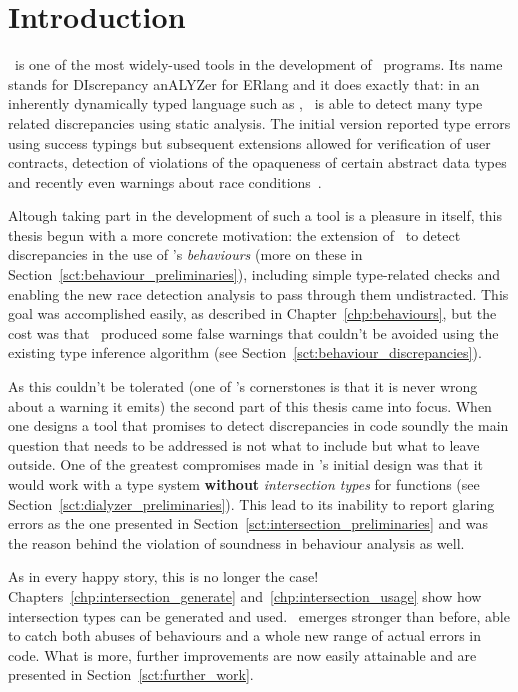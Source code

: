 \chapter{Introduction}

\dr\ is one of the most widely-used tools in the development of
\er\ programs. Its name stands for DIscrepancy anALYZer for ERlang and
it does exactly that: in an inherently dynamically typed language such
as \er, \dr\ is able to detect many type related discrepancies using
static analysis. The initial version reported type errors using
success typings but subsequent extensions allowed for verification of
user contracts, detection of violations of the opaqueness of certain
abstract data types and recently even warnings about race
conditions~\cite{Races@PADL-10,
  springerlink:10.1007/978-3-540-30477-7_7, SuccessTypings@PPDP-06,
  opaques}.

Altough taking part in the development of such a tool is a pleasure in
itself, this thesis begun with a more concrete motivation: the
extension of \dr\ to detect discrepancies in the use of \er's
\emph{behaviours} (more on these in
Section~\ref{sct:behaviour_preliminaries}), including simple
type-related checks and enabling the new race detection analysis to
pass through them undistracted. This goal was accomplished easily, as
described in Chapter~\ref{chp:behaviours}, but the cost was that
\dr\ produced some false warnings that couldn't be avoided using the
existing type inference algorithm (see
Section~\ref{sct:behaviour_discrepancies}).

As this couldn't be tolerated (one of \dr's cornerstones is that it is
never wrong about a warning it emits) the second part of this thesis
came into focus. When one designs a tool that promises to detect
discrepancies in code soundly the main question that needs to be
addressed is not what to include but what to leave outside. One of the
greatest compromises made in \dr's initial design was that it would
work with a type system \textbf{without} \emph{intersection types} for
functions (see Section~\ref{sct:dialyzer_preliminaries}). This lead to
its inability to report glaring errors as the one presented in
Section~\ref{sct:intersection_preliminaries} and was the reason behind
the violation of soundness in behaviour analysis as well.

As in every happy story, this is no longer the case!
Chapters~\ref{chp:intersection_generate}
and~\ref{chp:intersection_usage} show how intersection types can be
generated and used. \dr\ emerges stronger than before, able to catch
both abuses of behaviours and a whole new range of actual errors in
code. What is more, further improvements are now easily attainable and
are presented in Section~\ref{sct:further_work}.
